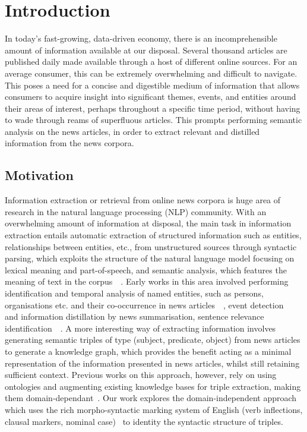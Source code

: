 \chapter{Introduction}
\vspace{-2ex}

In today's fast-growing, data-driven economy, there is an incomprehensible amount of information available at our disposal. Several thousand articles are published daily made available through a host of different online sources. For an average consumer, this can be extremely overwhelming and difficult to navigate. This poses a need for a concise and digestible medium of information that allows consumers to acquire insight into significant themes, events, and entities around their areas of interest, perhaps throughout a specific time period, without having to wade through reams of superfluous articles. This prompts performing semantic analysis on the news articles, in order to extract relevant and distilled information from the news corpora. 

\section{Motivation}

Information extraction or retrieval from online news corpora is huge area of research in the natural language processing (NLP) community. With an overwhelming amount of information at disposal, the main task in information extraction entails automatic extraction of structured information such as entities, relationships between entities, etc., from unstructured sources through syntactic parsing, which exploits the structure of the natural language model focusing on lexical meaning and part-of-speech, and semantic analysis, which features the meaning of text in the corpus~\cite{global_ents_intro}~\cite{sarawagi_info}. Early works in this area involved performing identification and temporal analysis of named entities, such as persons, organisations etc. and their co-occurrence in news articles~\cite{sarawagi_info}~\cite{intro_semntic_analysis_news}, event detection~\cite{finance}~\cite{finance_events} and information distillation by news summarisation, sentence relevance identification~\cite{news_info_extract}~\cite{summary_generation_intro}. A more interesting way of extracting information involves generating semantic triples of type (subject, predicate, object) from news articles to generate a knowledge graph, which provides the benefit acting as a minimal representation of the information presented in news articles, whilst still retaining sufficient context. Previous works on this approach, however, rely on using ontologies and augmenting existing knowledge bases for triple extraction, making them domain-dependant~\cite{wu2020knowledge}. Our work explores the domain-independent approach which uses the rich morpho-syntactic marking system of English (verb inflections, clausal markers, nominal case)~\cite{tseng2014chinese} to identity the syntactic structure of triples. 

